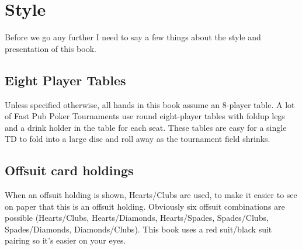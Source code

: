 \chapter{Style}


Before we go any further I need to say a few things about
the style and presentation of this book.

\section{Eight Player Tables}

Unless specified otherwise, all hands in this book assume an
8-player table. A lot of Fast Pub Poker Tournaments use
round eight-player tables with foldup legs and a drink holder
in the table for each seat. These tables are easy for a single TD
to fold into a large disc and roll away as the tournament
field shrinks.

\section{Offsuit card holdings}

When an offsuit holding is shown, Hearts/Clubs are used, to make
it easier to see on paper that this is an offsuit holding. Obviously
six offsuit combinations are possible (Hearts/Clubs, Hearts/Diamonds,
Hearts/Spades, Spades/Clubs, Spades/Diamonds, Diamonds/Clubs).
This book uses a red suit/black suit pairing so it's easier on your eyes.
